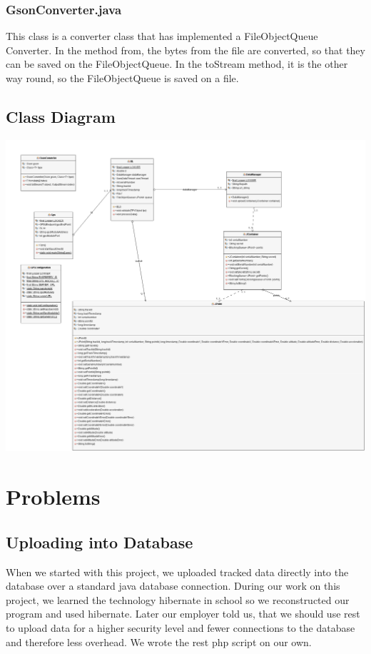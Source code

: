 \subsubsection{GsonConverter.java}
This class is a converter class that has implemented a FileObjectQueue Converter. In the method from, the bytes from the file are converted, so that they can be saved on the FileObjectQueue. In the toStream method, it is the other way round, so the FileObjectQueue is saved on a file.
\subsection{Class Diagram}
\begin{center}
\includegraphics[width=1\textwidth]{bilder/GPS_REST_UML_Diagram}
\end{center}
\section{Problems}
\subsection{Uploading into Database}
When we started with this project, we uploaded tracked data directly into the database over a standard java database connection. During our work on this project, we learned the technology hibernate in school so we reconstructed our program and used hibernate. Later our employer told us, that we should use \gls{rest} to upload data for a higher security level and fewer connections to the database and therefore less overhead. We wrote the \gls{rest} \gls{php} script on our own. 
